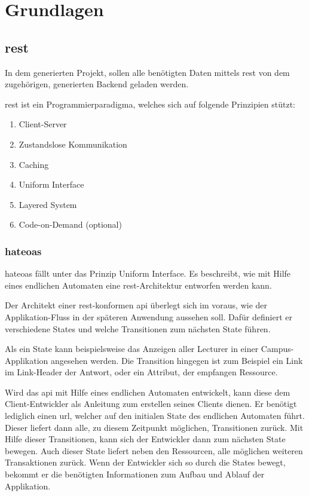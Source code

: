 \chapter{Grundlagen}\label{ch:basics}
\section{\acf{rest}}\label{sec:rest}
In dem generierten Projekt, sollen alle benötigten Daten mittels \ac{rest} von dem zugehörigen, generierten Backend geladen werden. 

\ac{rest} \cite{rest_fielding} ist ein Programmierparadigma, welches sich auf folgende Prinzipien stützt:


\begin{enumerate}
	\item  Client-Server
	\item  Zustandslose Kommunikation
	\item  Caching
	\item  Uniform Interface
	\item  Layered System
	\item  Code-on-Demand (optional)
\end{enumerate}

\subsection{\acf{hateoas}}\label{sec:hateoas}
\ac{hateoas} fällt unter das Prinzip Uniform Interface. Es beschreibt, wie mit Hilfe eines endlichen Automaten eine \ac{rest}-Architektur entworfen werden kann.

Der Architekt einer \ac{rest}-konformen \acf{api} überlegt sich im voraus, wie der Applikation-Fluss in der späteren Anwendung aussehen soll. Dafür definiert er verschiedene States und welche Transitionen zum nächsten State führen.

Als ein State kann beispielsweise das Anzeigen aller Lecturer in einer Campus-Applikation angesehen werden.
Die Transition hingegen ist zum Beispiel ein Link im Link-Header der Antwort, oder ein Attribut, der empfangen Ressource. 

Wird das \ac{api} mit Hilfe eines endlichen Automaten entwickelt, kann diese dem Client-Entwickler als Anleitung zum erstellen seines Clients dienen. Er benötigt lediglich einen \acf{url}, welcher auf den initialen State des endlichen Automaten führt. Dieser liefert dann alle, zu diesem Zeitpunkt möglichen, Transitionen zurück. Mit Hilfe dieser Transitionen, kann sich der Entwickler dann zum nächsten State bewegen. Auch dieser State liefert neben den Ressourcen, alle möglichen weiteren Transaktionen zurück. 
Wenn der Entwickler sich so durch die States bewegt, bekommt er die benötigten Informationen zum Aufbau und Ablauf der Applikation.

